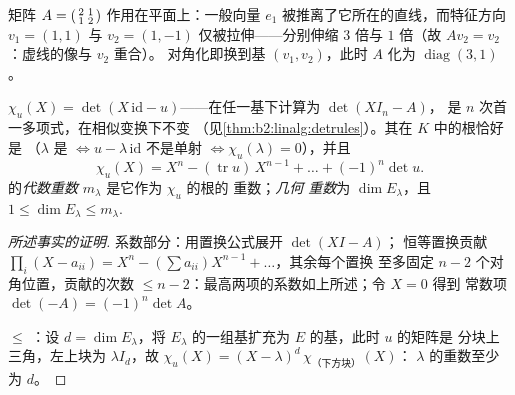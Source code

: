 \begin{omfigure}

{\small 矩阵 $A = \begin{psmallmatrix}2 & 1\\ 1 &
2\end{psmallmatrix}$ 作用在平面上：一般向量
$e_1$ 被推离了它所在的直线，而特征方向 $v_1 =
(1,1)$ 与 $v_2 = (1,-1)$ 仅被拉伸——分别伸缩 $3$ 倍与
$1$ 倍（故 $Av_2 = v_2$：虚线的像与 $v_2$ 重合）。
对角化即换到基 $(v_1, v_2)$，此时
$A$ 化为 $\operatorname{diag}(3, 1)$。}
\end{omfigure}

\begin{definition}[特征多项式]\label{def:b2:reduction:charpoly}
$\chi_u(X) = \det(X\,\mathrm{id} - u)$——在任一基下计算为 $\det(XI_n - A)$，
是 $n$ 次首一多项式，在相似变换下不变
（见\cref{thm:b2:linalg:detrules}）。其在 $K$ 中的根恰好是
（$\lambda$ 是 $\iff u - \lambda\,\mathrm{id}$
不是单射 $\iff \chi_u(\lambda) = 0$），并且
\[
\chi_u(X) = X^n - (\operatorname{tr} u)\, X^{n-1} + \dots +
(-1)^n \det u .
\]
的\emph{代数重数}
$m_\lambda$ 是它作为 $\chi_u$ 的根的
重数；\emph{几何
重数}为 $\dim E_\lambda$，且 $1 \leq \dim E_\lambda \leq
m_\lambda$.
\end{definition}

\begin{proof}[所述事实的证明]
系数部分：用置换公式展开 $\det(XI - A)$；
恒等置换贡献 $\prod_i (X - a_{ii})
= X^n - (\sum a_{ii})X^{n-1} + \dots$，其余每个置换
至多固定 $n - 2$ 个对角位置，贡献的次数 $\leq
n - 2$：最高两项的系数如上所述；令 $X = 0$ 得到
常数项 $\det(-A) = (-1)^n\det A$。

 $\leq$ ：设 $d = \dim E_\lambda$，将
$E_\lambda$ 的一组基扩充为 $E$ 的基，此时 $u$ 的矩阵是
分块上三角，左上块为 $\lambda I_d$，故 $\chi_u(X) =
(X - \lambda)^d\, \chi_{\text{（下方块）}}(X)$：
$\lambda$ 的重数至少为 $d$。
\end{proof}

